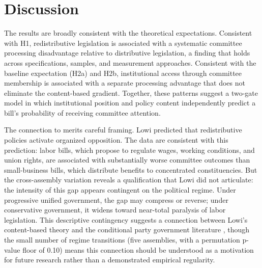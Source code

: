 \documentclass[11pt]{article}
\begin{document}

\section{Discussion}
\label{sec:discussion}

The results are broadly consistent with the theoretical expectations. Consistent with H1, redistributive legislation is associated with a systematic committee processing disadvantage relative to distributive legislation, a finding that holds across specifications, samples, and measurement approaches. Consistent with the baseline expectation (H2a) and H2b, institutional access through committee membership is associated with a separate processing advantage that does not eliminate the content-based gradient. Together, these patterns suggest a two-gate model in which institutional position and policy content independently predict a bill's probability of receiving committee attention.

The connection to \citet{lowi1964} merits careful framing. Lowi predicted that redistributive policies activate organized opposition. The data are consistent with this prediction: labor bills, which propose to regulate wages, working conditions, and union rights, are associated with substantially worse committee outcomes than small-business bills, which distribute benefits to concentrated constituencies. But the cross-assembly variation reveals a qualification that Lowi did not articulate: the intensity of this gap appears contingent on the political regime. Under progressive unified government, the gap may compress or reverse; under conservative government, it widens toward near-total paralysis of labor legislation. This descriptive contingency suggests a connection between Lowi's content-based theory and the conditional party government literature \citep{cox2005,aldrich2001}, though the small number of regime transitions (five assemblies, with a permutation p-value floor of 0.10) means this connection should be understood as a motivation for future research rather than a demonstrated empirical regularity.
\end{document}
